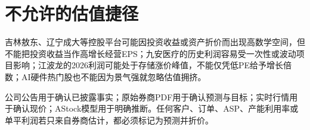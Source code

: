 \section{不允许的估值捷径}

吉林敖东、辽宁成大等控股平台可能因投资收益或资产折价而出现高数学空间，但不能把投资收益当作高增长经营EPS；九安医疗的历史利润容易受一次性或波动项目影响；江波龙的2026利润可能处于存储涨价峰值，不能仅凭低PE给予增长倍数；AI硬件热门股也不能因为景气强就忽略估值拥挤。

\begin{disclosurebox}[证据分层]
公司公告用于确认已披露事实；原始券商PDF用于确认预测与目标；实时行情用于确认现价；AStock模型用于明确推断。任何客户、订单、ASP、产能利用率或单平利润若只来自券商估计，都必须标记为预测并折价。
\end{disclosurebox}

\clearpage
